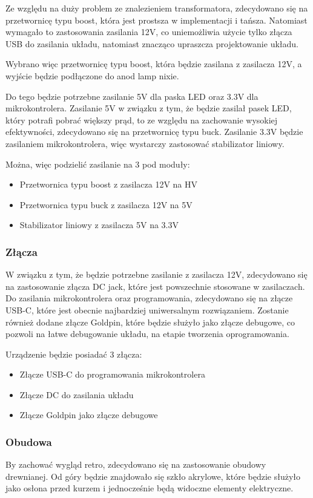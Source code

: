 \documentclass[../main.tex]{subfiles}
\begin{document}
Ze względu na duży problem ze znalezieniem transformatora, zdecydowano się na przetwornicę typu boost, która jest prostsza w implementacji i tańsza. Natomiast wymagało
to zastosowania zasilania 12V, co uniemożliwia użycie tylko złącza USB do zasilania układu, natomiast znacząco upraszcza projektowanie układu.

Wybrano więc przetwornicę typu boost, która będzie zasilana z zasilacza 12V, a wyjście będzie podłączone do anod lamp nixie.

Do tego będzie potrzebne zasilanie 5V dla paska LED oraz 3.3V dla mikrokontrolera. Zasilanie 5V w związku z tym, że będzie zasilał pasek LED, który potrafi pobrać większy prąd,
to ze względu na zachowanie wysokiej efektywności, zdecydowano się na przetwornicę typu buck. Zasilanie 3.3V będzie zasilaniem mikrokontrolera, więc wystarczy zastosować
stabilizator liniowy.

Można, więc podzielić zasilanie na 3 pod moduły:
\begin{itemize}
    \item Przetwornica typu boost z zasilacza 12V na HV
    \item Przetwornica typu buck z zasilacza 12V na 5V
    \item Stabilizator liniowy z zasilacza 5V na 3.3V
\end{itemize}

\subsubsection{Złącza}
W związku z tym, że będzie potrzebne zasilanie z zasilacza 12V, zdecydowano się na zastosowanie złącza DC jack, które jest powszechnie stosowane w zasilaczach.
Do zasilania mikrokontrolera oraz programowania, zdecydowano się na złącze USB-C, które jest obecnie najbardziej uniwersalnym rozwiązaniem.
Zostanie również dodane złącze Goldpin, które będzie służyło jako złącze debugowe, co pozwoli na łatwe debugowanie układu, na etapie tworzenia oprogramowania.

Urządzenie będzie posiadać 3 złącza:
\begin{itemize}
    \item Złącze USB-C do programowania mikrokontrolera
    \item Złącze DC do zasilania układu
    \item Złącze Goldpin jako złącze debugowe
\end{itemize}

\subsubsection{Obudowa}
By zachować wygląd retro, zdecydowano się na zastosowanie obudowy drewnianej. Od góry będzie znajdowało się szkło akrylowe, które będzie służyło jako osłona przed kurzem
i jednocześnie będą widoczne elementy elektryczne.
\end{document}

